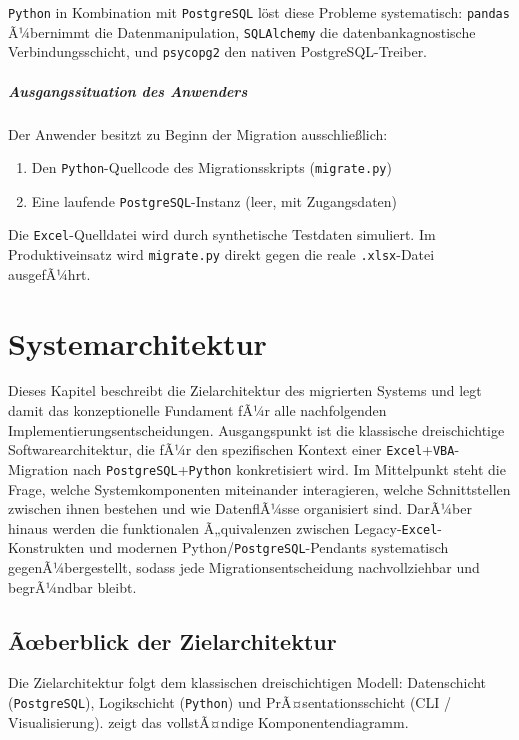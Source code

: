 ﻿\documentclass[12pt,a4paper]{report}
\theoremstyle{definition}
\theoremstyle{remark}
\newcommand{\excel}{\texttt{Excel}}
\newcommand{\vba}{\texttt{VBA}}
\newcommand{\pg}{\texttt{PostgreSQL}}
\newcommand{\py}{\texttt{Python}}
\newcommand{\pandas}{\texttt{pandas}}
\newcommand{\sqlalchemy}{\texttt{SQLAlchemy}}
\newcommand{\psycopg}{\texttt{psycopg2}}
\newcommand{\code}[1]{\texttt{#1}}
\begin{document}
\py{} in Kombination mit \pg{} l\"ost diese Probleme systematisch: \pandas{}
Ã¼bernimmt die Datenmanipulation, \sqlalchemy{} die datenbankagnostische
Verbindungsschicht, und \psycopg{} den nativen PostgreSQL-Treiber.

\paragraph{Ausgangssituation des Anwenders}
Der Anwender besitzt zu Beginn der Migration ausschlie\ss{}lich:
\begin{enumerate}[leftmargin=1.5em, topsep=2pt]
  \item Den \py-Quellcode des Migrationsskripts (\code{migrate.py})
  \item Eine laufende \pg-Instanz (leer, mit Zugangsdaten)
\end{enumerate}
Die \excel-Quelldatei wird durch synthetische Testdaten simuliert.
Im Produktiveinsatz wird \code{migrate.py} direkt gegen die reale
\code{.xlsx}-Datei ausgefÃ¼hrt.

\chapter{Systemarchitektur}

Dieses Kapitel beschreibt die Zielarchitektur des migrierten Systems und legt damit das konzeptionelle Fundament fÃ¼r alle nachfolgenden Implementierungsentscheidungen. Ausgangspunkt ist die klassische dreischichtige Softwarearchitektur, die fÃ¼r den spezifischen Kontext einer \excel{}+\vba{}-Migration nach \pg{}+\py{} konkretisiert wird. Im Mittelpunkt steht die Frage, welche Systemkomponenten miteinander interagieren, welche Schnittstellen zwischen ihnen bestehen und wie DatenflÃ¼sse organisiert sind. DarÃ¼ber hinaus werden die funktionalen Ã„quivalenzen zwischen Legacy-\excel-Konstrukten und modernen Python/\pg{}-Pendants systematisch gegenÃ¼bergestellt, sodass jede Migrationsentscheidung nachvollziehbar und begrÃ¼ndbar bleibt.

\section{Ãœberblick der Zielarchitektur}
Die Zielarchitektur folgt dem klassischen dreischichtigen Modell:
Datenschicht (\pg), Logikschicht (\py) und PrÃ¤sentationsschicht
(CLI / Visualisierung).  zeigt das vollstÃ¤ndige
Komponentendiagramm.
\end{document}
